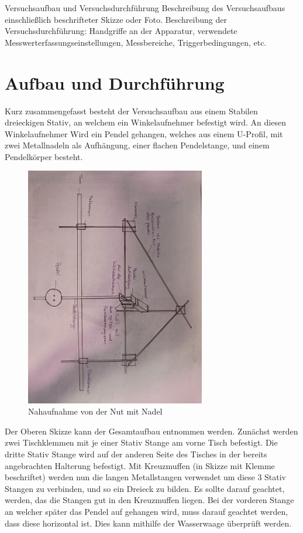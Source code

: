 \documentclass[twoside]{protokoll}
\begin{document}
\begin{aufgabe}{Versuchsaufbau und Versuchsdurchführung}
  Beschreibung des Versuchsaufbaus einschließlich beschrifteter Skizze
  oder Foto. Beschreibung der Versuchsdurchführung: Handgriffe an der
  Apparatur, verwendete Messwerterfassungseinstellungen, Messbereiche,
  Triggerbedingungen, etc.
\end{aufgabe}

\section{Aufbau und Durchführung}
Kurz zusammengefasst besteht der Versuchsaufbau aus einem Stabilen dreieckigen Stativ, an welchem ein Winkelaufnehmer befestigt wird.
An diesen Winkelaufnehmer Wird ein Pendel gehangen, welches aus einem U-Profil, mit zwei Metallnadeln als Aufhängung, einer flachen Pendelstange, und einem Pendelkörper besteht.\\

\begin{figure}[H]
    \centering
    \includegraphics[width=0.7\textwidth]{Bilder/Kompletter-Aufbau.pdf}
    \caption{Nahaufnahme von der Nut mit Nadel}
\end{figure}

Der Oberen Skizze kann der Gesamtaufbau entnommen werden. 
Zunächst werden zwei Tischklemmen mit je einer Stativ Stange am vorne Tisch befestigt.
Die dritte Stativ Stange wird auf der anderen Seite des Tisches in der bereits angebrachten Halterung befestigt. 
Mit Kreuzmuffen (in Skizze mit Klemme beschriftet) werden nun die langen Metallstangen verwendet um diese 3 Stativ Stangen zu verbinden, und so ein Dreieck zu bilden.
Es sollte darauf geachtet, werden, das die Stangen gut in den Kreuzmuffen liegen. 
Bei der vorderen Stange an welcher später das Pendel auf gehangen wird, muss darauf geachtet werden, dass diese horizontal ist.
Dies kann mithilfe der Wasserwaage überprüft werden.\\
\end{document}
